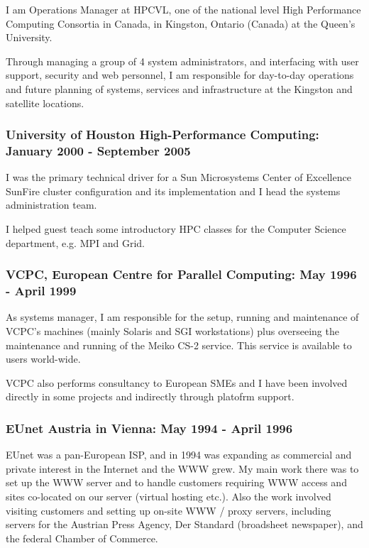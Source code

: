 \documentclass[10pt,english]{article}
\begin{document}
    I am Operations Manager at HPCVL, one of the national level High
    Performance Computing Consortia in Canada, in Kingston, Ontario
    (Canada) at the Queen's University.

    Through managing a group of 4 system administrators, and
    interfacing with user support, security and web personnel, I am
    responsible for day-to-day operations and future planning of
    systems, services and infrastructure at the Kingston and satellite
    locations.

\subsubsection*{University of Houston High-Performance Computing:
  January 2000 - September 2005}

    I was the primary technical driver for a Sun Microsystems Center
    of Excellence SunFire cluster configuration and its implementation
    and I head the systems administration team.

    I helped guest teach some introductory HPC classes for the Computer
    Science department, e.g. MPI and Grid.

\subsubsection*{VCPC, European Centre for Parallel Computing:
  May 1996 - April 1999}

    As systems manager, I am responsible for the setup, running and
    maintenance of VCPC's machines (mainly Solaris and SGI
    workstations) plus overseeing the maintenance and running of the
    Meiko CS-2 service. This service is available to users world-wide.

    VCPC also performs consultancy to European SMEs and I have been
    involved directly in some projects and indirectly through platofrm
    support.

\subsubsection*{EUnet Austria in Vienna:
  May 1994 - April 1996}

    EUnet was a pan-European ISP, and in 1994 was expanding as
    commercial and private interest in the Internet and the WWW grew.
    My main work there was to set up the WWW server and to handle
    customers requiring WWW access and sites co-located on our server
    (virtual hosting etc.).  Also the work involved visiting customers
    and setting up on-site WWW / proxy servers, including servers for
    the Austrian Press Agency, Der Standard (broadsheet newspaper),
    and the federal Chamber of Commerce.
\end{document}
